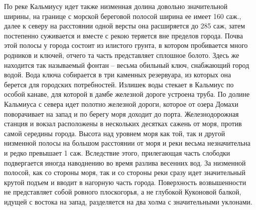 По реке Кальмиусу идет также низменная долина довольно значительной ширины, на
границе с морской береговой полосой ширина ее имеет 160 саж., далее к северу на
расстоянии одной версты она расширяется до 285 саж, затем постепенно суживается
и вместе с рекою теряется вне пределов города.  Почва этой полосы у города
состоит из илистого грунта, в котором пробивается много родников и ключей,
отчего та часть представляет сплошное болото. Здесь же находится так называемый
фонтан – весьма обильный ключ, снабжающий город водой.  Вода ключа собирается в
три каменных резервуара, из которых она берется для городских потребностей.
Излишек воды стекает в Кальмиус по особой канаве, для которой в дамбе железной
дороге устроена труба. По долине Кальмиуса с севера идет полотно железной
дороги, которое от озера Домахи поворачивает на запад и по берегу моря доходит
до порта. Железнодорожная станция и вокзал расположены в нескольких десятках
сажень от моря, против самой середины города. Высота над уровнем моря как той,
так и другой низменной полосы на большом расстоянии от моря и реки весьма
незначительна и редко превышает 1 саж. Вследствие этого, прилегающая часть
слободки подвергается иногда наводнению во время разлива весенних вод. За
низменной полосой, как со стороны моря, так и со стороны реки сразу идет
значительный крутой подъем и вводит в нагорную часть города.  Поверхность
возвышенности не представляет собой ровного плоскогорья, а не глубокой
Куконовой балкой, идущей с востока на запад, разделяется на два холма с
значительными уклонами. 

